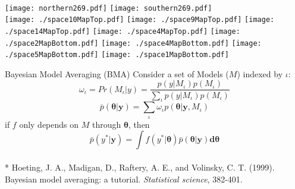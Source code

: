 \documentclass[ xcolor = pdftex, dvipsnames, table ]{beamer}
\begin{document}
\begin{frame}{}%
$~$\\
\hspace*{-1cm}
\texttt{[image: northern269.pdf]}
\texttt{[image: southern269.pdf]}\\
\vspace{-0.5cm}
\hspace*{-0.3cm}
\texttt{[image: ./space10MapTop.pdf]}
\texttt{[image: ./space9MapTop.pdf]}
\texttt{[image: ./space14MapTop.pdf]}
\texttt{[image: ./space4MapTop.pdf]}
\hspace*{0.9cm}
\texttt{[image: ./space2MapBottom.pdf]}
\texttt{[image: ./space4MapBottom.pdf]}
\texttt{[image: ./space5MapBottom.pdf]}
\texttt{[image: ./space1MapBottom.pdf]}
\end{frame}

%
%

\begin{frame}{Bayesian Model Averaging (BMA)}
      	Consider a set of Models ($M$) indexed by $\iota$: %
      	\begin{equation*}
	\omega_\iota = Pr(M_\iota|y) = \frac{ p(y|M_\iota)p(M_\iota) }{ \sum_\iota p(y|M_\iota)p(M_\iota) }
	\end{equation*}
      	\begin{equation*}
      	\bar p(\bm{\theta}|\bm{y}) = \sum_{\iota} \omega_\iota p(\bm{\theta}|\bm{y}, M_\iota)
      	\end{equation*}
	\indent if $f$ only depends on $M$ through $\bm{\theta}$, then
      	\begin{equation*}
      	\bar p(y^*|\bm{y}) = \bm{\int} f(y^*|\bm{\theta}) \bar p(\bm{\theta}|\bm{y}) \bm{d\theta}
      	\end{equation*}
$~$\\
\fontsize{6pt}{7.2}\selectfont
* Hoeting, J. A., Madigan, D., Raftery, A. E., and Volinsky, C. T. (1999). Bayesian model averaging: a tutorial. \textit{Statistical science}, 382-401.
\end{frame}
\end{document}
